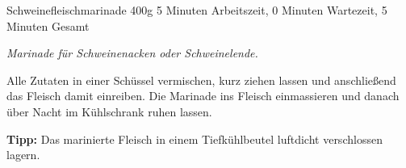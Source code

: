 \begin{recipe}{Schweinefleischmarinade} {400g} {5 Minuten Arbeitszeit, 0 Minuten Wartezeit, 5 Minuten Gesamt}

  \freeform{}\textit{Marinade für Schweinenacken oder Schweinelende.}


  Alle Zutaten in einer Schüssel vermischen, kurz ziehen lassen und anschließend das Fleisch damit einreiben.
  Die Marinade ins Fleisch einmassieren und danach über Nacht im Kühlschrank ruhen lassen.

  \freeform{}\hrulefill{}

  \freeform{}\textbf{Tipp:}
  Das marinierte Fleisch in einem Tiefkühlbeutel luftdicht verschlossen lagern.

\end{recipe}
